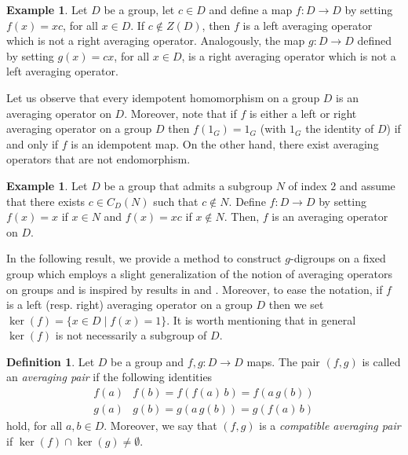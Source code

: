 \documentclass[preprint,1p]{elsarticle}
\numberwithin{equation}{section}
\theoremstyle{definition}               %
\newtheorem{defin}[theor]{Definition}
\newtheorem{ex}[theor]{Example}
\begin{document}
\begin{ex}
    Let $D$ be a group, let $c \in D$ and define a map $f:D \to D$ by setting $f(x) = xc$, for all $x \in D$.
    If $c \notin Z(D)$, then $f$ is a left averaging operator which is not a right averaging operator.
    Analogously, the map $g:D \to D$ defined by setting $g(x) = cx$, for all $x \in D$, is a right averaging operator which is not a left averaging operator.
\end{ex}

Let us observe that every idempotent homomorphism on a group $D$ is an averaging operator on $D$. Moreover, note that if $f$ is either a left or right averaging operator on a group $D$ then $f\left(1_G\right) = 1_G$ (with $1_G$ the identity of $D$) if and only if $f$ is an idempotent map. On the other hand, there exist averaging operators that are not endomorphism.

\begin{ex}
    Let $D$ be a group {that admits a subgroup $N$ of index $2$ and assume that there exists $c \in C_D(N)$ such that $c \notin N$.}
    Define $f:D \to D$ by setting $f(x) = x$ if $x \in N$ and $f(x) = xc$ if $x\notin N$. 
    Then, $f$ is an averaging operator on $D$.
\end{ex}

\medskip

In the following result, we provide a method to construct $g$-digroups on a fixed group which employs a slight generalization of the notion of averaging operators on groups and is inspired by results in \cite[Proposition~5.6]{ChMa25x} and \cite[Proposition~3.8]{ZhGa24x}.
Moreover, to ease the notation, if $f$ is a left (resp. right) averaging operator on a group $D$ then we set $\ker(f) = \{x \in D \mid f(x) = 1\}$.
It is worth mentioning that in general $\ker(f)$ is not necessarily a subgroup of $D$.

\begin{defin}
    Let $D$ be a group and $f,g:D \to D$ maps. The pair $(f,g)$ is called an \emph{averaging pair} if the following identities 
    \begin{align}
        f(a)& f(b)
        = f(f(a)\,b)
        = f(a\, g(b))  \label{ex_KU_1}\\
        g(a)& g(b)
        = g(a\, g(b))
        = g(f(a)\, b)\label{ex_KU_2}
\end{align}
    hold, for all $a,b \in D$. Moreover, we say that $(f,g)$ is a \emph{compatible averaging pair} if $\ker(f)\cap\ker(g)\neq\emptyset$.
\end{defin}
\end{document}
